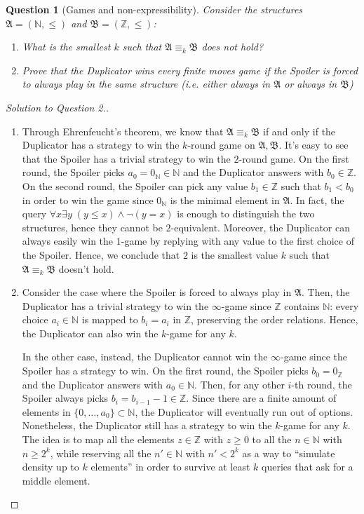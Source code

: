 \documentclass[12pt,a4paper]{report}
\newtheorem{question}{Question}
\theoremstyle{definition}
\newcommand{\curlyquotes}[1]{\textquotedblleft #1\textquotedblright}
\newcommand{\N}{\mathbb{N}}                     %
\newcommand{\Z}{\mathbb{Z}}                     %
\newcommand{\model}[1]{\mathfrak{#1}}           %
\begin{document}
    \newpage

    \begin{question}[Games and non-expressibility]
        Consider the structures $\model{A} = (\N, \leq)$ and $\model{B} = (\Z, \leq)$:
        \begin{enumerate}
            \item What is the smallest $k$ such that $\model{A} \equiv_k \model{B}$ does not hold?
            \item Prove that the Duplicator wins every finite moves game if the Spoiler is forced to always play in the same structure (i.e. either always in $\model{A}$ or always in $\model{B}$)
        \end{enumerate}
    \end{question}

    \begin{proof}[Solution to Question 2.]
        \quad

        \begin{enumerate}
            \item Through Ehrenfeucht's theorem, we know that $\model{A} \equiv_k \model{B}$ if and only if the Duplicator has a strategy to win the $k$-round game on $\model{A}, \model{B}$. It's easy to see that the Spoiler has a trivial strategy to win the $2$-round game. On the first round, the Spoiler picks $a_0 = 0_\N \in \N$ and the Duplicator answers with $b_0 \in \Z$. On the second round, the Spoiler can pick any value $b_1 \in \Z$ such that $b_1 < b_0$ in order to win the game since $0_\N$ is the minimal element in $\model{A}$. In fact, the query $\forall x \exists y \; (y \leq x) \land \lnot(y = x)$ is enough to distinguish the two structures, hence they cannot be $2$-equivalent. Moreover, the Duplicator can always easily win the $1$-game by replying with any value to the first choice of the Spoiler. Hence, we conclude that $2$ is the smallest value $k$ such that $\model{A} \equiv_k \model{B}$ doesn't hold.
            
            \item Consider the case where the Spoiler is forced to always play in $\model{A}$. Then, the Duplicator has a trivial strategy to win the $\infty$-game since $\Z$ contains $\N$: every choice $a_i \in \N$ is mapped to $b_i = a_i$ in $\Z$, preserving the order relations. Hence, the Duplicator can also win the $k$-game for any $k$.
            
            In the other case, instead, the Duplicator cannot win the $\infty$-game since the Spoiler has a strategy to win. On the first round, the Spoiler picks $b_0 = 0_\Z$ and the Duplicator answers with $a_0 \in \N$. Then, for any other $i$-th round, the Spoiler always picks $b_{i} = b_{i-1}-1 \in \Z$. Since there are a finite amount of elements in $\{0, \ldots, a_0\} \subset \N$, the Duplicator will eventually run out of options. Nonetheless, the Duplicator still has a strategy to win the $k$-game for any $k$. The idea is to map all the elements $z \in \Z$ with $z \geq 0$ to all the $n \in \N$ with $n \geq 2^k$, while reserving all the $n' \in \N$ with $n' < 2^k$ as a way to \curlyquotes{simulate density up to $k$ elements} in order to survive at least $k$ queries that ask for a middle element.


\end{enumerate}
\end{proof}
\end{document}

